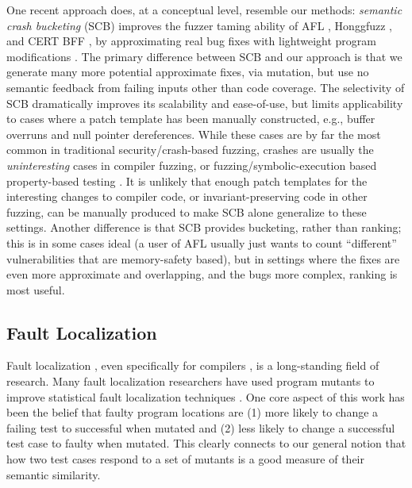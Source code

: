 One recent approach does, at a conceptual level, resemble our methods:  \emph{semantic crash bucketing} (SCB) improves the fuzzer taming ability of AFL \cite{aflfuzz}, Honggfuzz \cite{honggfuzz}, and CERT BFF \cite{BFF}, by approximating real bug fixes with lightweight program modifications \cite{SCB}.  The primary difference between SCB and our approach is that we generate many more potential approximate fixes, via mutation, but use no semantic feedback from failing inputs other than code coverage.  The selectivity of SCB dramatically improves its scalability and ease-of-use, but limits applicability to cases where a patch template has been manually constructed, e.g., buffer overruns and null pointer dereferences.  While these cases are by far the most common in traditional security/crash-based fuzzing, crashes are usually the \emph{uninteresting} cases in compiler fuzzing, or fuzzing/symbolic-execution based property-based \cite{ClaessenH00} testing \cite{DeepState,DeepStateTutorial,deepstaterepo}.  It is unlikely that enough patch templates for the interesting changes to compiler code, or invariant-preserving code in other fuzzing, can be manually produced to make SCB alone generalize to these settings.  Another difference is that SCB provides bucketing, rather than ranking; this is in some cases ideal (a user of AFL usually just wants to count ``different'' vulnerabilities that are memory-safety based), but in settings where the fixes are even more approximate and overlapping, and the bugs more complex, ranking is most useful.  

\subsection{Fault Localization}

Fault localization \cite{FaultSurvey,NearNeighbor,Liblit03,Liblit05,Cleve05,Jones2002,Jones05,Jones07,GroceError,ChakiLev,Liu06,SPIN03,Santelices:ICSE:2009,Abreu:2006:PRDC,xuan2014test,DD}, even specifically for compilers \cite{Whalley94}, is a long-standing field of research.  Many fault localization researchers have used program mutants to improve statistical \cite{Jones2002} fault localization techniques \cite{MUSE,DebroyMutant,FasterMutant,multilingual,Metallaxis,MetalSelect,Papadakis,MechLocal,MurtazaTrace,Musco}.
One  core aspect of this work has been the belief that faulty program locations are (1) more likely to change a failing test to successful when mutated and (2) less likely to change a successful test case to faulty when mutated.  This clearly connects to our general notion that how two test cases respond to a set of mutants is a good measure of their semantic similarity.  

